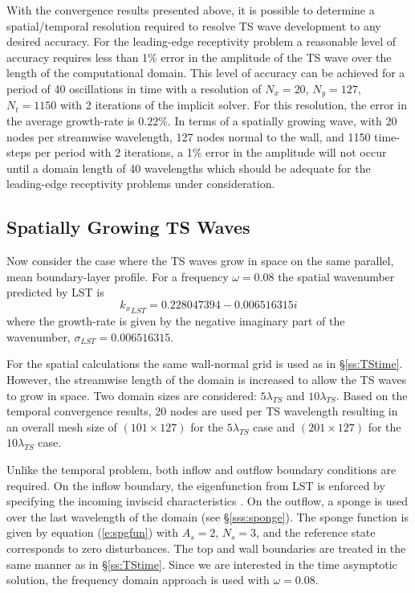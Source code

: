 With the convergence results presented above, it is possible to determine a
spatial/temporal resolution required to resolve TS wave development to any
desired accuracy.  For the leading-edge receptivity problem a reasonable level
of accuracy requires less than 1\% error in the amplitude of the TS wave over
the length of the computational domain.  This level of accuracy can be
achieved for a period of 40 oscillations in time with a resolution of
$N_x=20$, $N_y=127$, $N_t=1150$ with 2 iterations of the implicit solver.  For
this resolution, the error in the average growth-rate is $0.22\%$.  In terms
of a spatially growing wave, with 20 nodes per streamwise wavelength, 127
nodes normal to the wall, and 1150 time-steps per period with 2 iterations, a
1\% error in the amplitude will not occur until a domain length of 40
wavelengths which should be adequate for the leading-edge receptivity problems
under consideration.

\subsection{Spatially Growing TS Waves \label{ss:TSspace} }

Now consider the case where the TS waves grow in space on the same parallel,
mean boundary-layer profile.  For a frequency $\omega=0.08$ the spatial
wavenumber predicted by LST is
%
%
%
%
\begin{equation}
  {k_x}_{LST} = 0.228047394 - 0.006516315 i
\end{equation}
%
where the growth-rate is given by the negative imaginary part of the
wavenumber, $\sigma_{LST} = 0.006516315$.

For the spatial calculations the same wall-normal grid is used as in
\S\ref{ss:TStime}. However, the streamwise length of the domain is increased
to allow the TS waves to grow in space.  Two domain sizes are considered: $5
\lambda_{TS}$ and $10 \lambda_{TS}$.  Based on the temporal convergence
results, 20 nodes are used per TS wavelength resulting in an overall mesh size
of $(101 \times 127)$ for the $5\lambda_{TS}$ case and $(201 \times 127)$ for
the $10\lambda_{TS}$ case.

Unlike the temporal problem, both inflow and outflow boundary conditions are
required.  On the inflow boundary, the eigenfunction from LST is enforced by
specifying the incoming inviscid char\-acter\-istics \cite{Giles:90}. On the
outflow, a sponge is used over the last wavelength of the domain (see
\S\ref{sss:sponge}).  The sponge function is given by equation
(\ref{e:spgfun}) with $A_s = 2$, $N_s = 3$, and the reference state
corresponds to zero disturbances.  The top and wall boundaries are treated in
the same manner as in \S\ref{ss:TStime}.  Since we are interested in the time
asymptotic solution, the frequency domain approach is used with $\omega =
0.08$.

